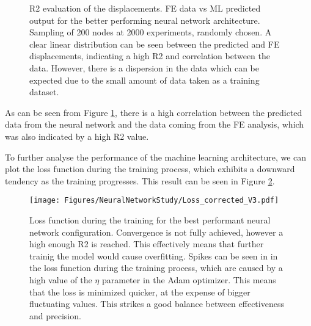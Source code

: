 \begin{figure}
  \centering
  \caption{R2 evaluation of the displacements. FE data vs ML predicted output for the better performing neural network architecture. Sampling of 200 nodes at 2000 experiments, randomly chosen. A clear linear distribution can be seen between the predicted and FE displacements, indicating a high R2 and correlation between the data. However, there is a dispersion in the data which can be expected due to the small amount of data taken as a training dataset.}
  \label{fig: R2_plot}
\end{figure}

As can be seen from Figure \ref{fig: R2_plot}, there is a high correlation between the predicted data from the neural network and the data coming from the FE analysis, which was also indicated by a high R2 value.

To further analyse the performance of the machine learning architecture, we can plot the loss function during the training process, which exhibits a downward tendency as the training progresses. This result can be seen in Figure \ref{fig: losses}. 


\begin{figure}
  \begin{center}
    \texttt{[image: Figures/NeuralNetworkStudy/Loss\_corrected\_V3.pdf]}
  \end{center}
  \caption{Loss function during the training for the best performant neural network configuration. Convergence is not fully achieved, however a high enough R2 is reached. This effectively means that further trainig the model would cause overfitting. Spikes can be seen in in the loss function during the training process, which are caused by a high value of the $\eta$ parameter in the Adam optimizer. This means that the loss is minimized quicker, at the expense of bigger fluctuating values. This strikes a good balance between effectiveness and precision.}
  \label{fig: losses}
\end{figure}

\newpage
